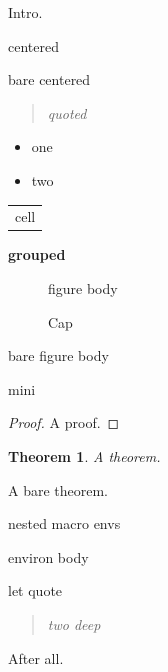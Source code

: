\documentclass{article}
\newtheorem{thm}{Theorem}
\newenvironment{wc}{\begin{center}}{\end{center}}
\newenvironment{bc}{\center}{\endcenter}
\newenvironment{wq}{\begin{quote}\itshape}{\end{quote}}
\newenvironment{wi}{\begin{itemize}}{\end{itemize}}
\newenvironment{wt}{\begin{tabular}{c}}{\end{tabular}}
\newenvironment{wg}{\begingroup\bfseries}{\endgroup}
\newenvironment{wf}{\begin{figure}[h]}{\end{figure}}
\newenvironment{bfig}{\figure[h]}{\endfigure}
\newenvironment{wm}{\begin{minipage}{3cm}}{\end{minipage}}
\newenvironment{wprf}{\begin{proof}}{\end{proof}}
\newenvironment{wth}{\begin{thm}}{\end{thm}}
\newenvironment{bth}{\thm}{\endthm}
\newenvironment{outr}{\begin{wc}}{\end{wc}}
\begin{document}
Intro.
\begin{wc} centered \end{wc}
\begin{bc} bare centered \end{bc}
\begin{wq} quoted \end{wq}
\begin{wi}\item one \item two\end{wi}
\begin{wt} cell \end{wt}
\begin{wg} grouped \end{wg}
\begin{wf} figure body \caption{Cap}\end{wf}
\begin{bfig} bare figure body \caption{Cap2}\end{bfig}
\begin{wm} mini \end{wm}
\begin{wprf} A proof. \end{wprf}
\begin{wth} A theorem. \end{wth}
\begin{bth} A bare theorem. \end{bth}
\begin{outr} nested macro envs \end{outr}
\begin{boxed} environ body \end{boxed}
\begin{myquote} let quote \end{myquote}
\begin{wc}\begin{wq} two deep \end{wq}\end{wc}
After all.
\end{document}
